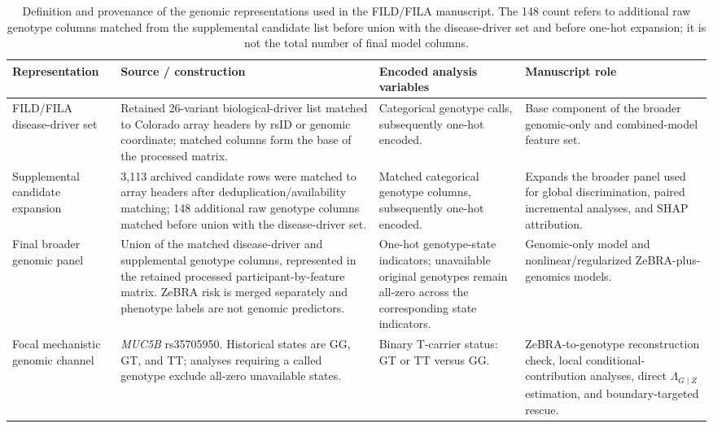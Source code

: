 \begin{table}[!t]
\caption{Definition and provenance of the genomic representations used in the FILD/FILA manuscript. The 148 count refers to additional raw genotype columns matched from the supplemental candidate list before union with the disease-driver set and before one-hot expansion; it is not the total number of final model columns.}
\label{tab:supp-genomic-panel}
\centering\scriptsize
\setlength{\tabcolsep}{4pt}
\renewcommand{\arraystretch}{1.06}
\begin{adjustbox}{max width=\textwidth}
\begin{tabular}{p{}p{}p{}p{}}
\toprule
Representation & Source / construction & Encoded analysis variables & Manuscript role\\
\midrule
FILD/FILA disease-driver set & Retained 26-variant biological-driver list matched to Colorado array headers by rsID or genomic coordinate; matched columns form the base of the processed matrix. & Categorical genotype calls, subsequently one-hot encoded. & Base component of the broader genomic-only and combined-model feature set.\\
Supplemental candidate expansion & 3,113 archived candidate rows were matched to array headers after deduplication/availability matching; 148 additional raw genotype columns matched before union with the disease-driver set. & Matched categorical genotype columns, subsequently one-hot encoded. & Expands the broader panel used for global discrimination, paired incremental analyses, and SHAP attribution.\\
Final broader genomic panel & Union of the matched disease-driver and supplemental genotype columns, represented in the retained processed participant-by-feature matrix. ZeBRA risk is merged separately and phenotype labels are not genomic predictors. & One-hot genotype-state indicators; unavailable original genotypes remain all-zero across the corresponding state indicators. & Genomic-only model and nonlinear/regularized ZeBRA-plus-genomics models.\\
Focal mechanistic genomic channel & \textit{MUC5B} rs35705950. Historical states are GG, GT, and TT; analyses requiring a called genotype exclude all-zero unavailable states. & Binary T-carrier status: GT or TT versus GG. & ZeBRA-to-genotype reconstruction check, local conditional-contribution analyses, direct $\Lambda_{G\mid Z}$ estimation, and boundary-targeted rescue.\\
\bottomrule
\end{tabular}
\end{adjustbox}
\end{table}

